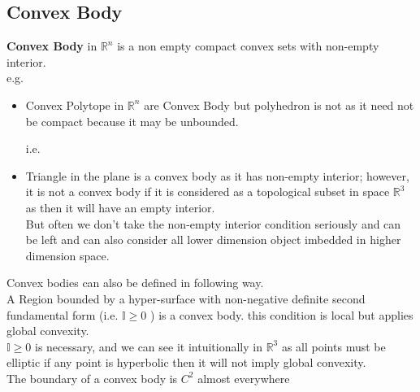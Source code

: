 \documentclass[oneside]{book}
\newtheorem{mydef}{Definition}
\begin{document}
\begin{comment}
\begin{mydef}
A function $f: \mathbb{R}^{n} \rightarrow(-\infty, \infty]$ is \textbf{positively homogeneous} of degree 1 if
$$
f(\alpha x)=\alpha f(x), \quad \text { for all } x \in \mathbb{R}^{n}, \alpha \geq 0
$$
$f$ is convex if and only if it is subadditive, given  $f$ is positively homogeneous  as
$$
 f(x+y) \leq f(x)+f(y)  \text{and }f(\alpha x)=\alpha f(x) $$,
  \quad $ \text { for all } R$
  gives definition of convex function
\end{mydef}

\end{comment}








 \subsection{Convex Body}
 
\textbf{Convex Body } in  $\mathbb{R}^n$  is a non empty compact convex sets with non-empty interior.\\
e.g.\\
\begin{itemize}
    \item   Convex Polytope in $\mathbb{R}^n$ are Convex Body but polyhedron is not as it need not be compact because it may be unbounded. 
    
    i.e.\\
    
    \item 
Triangle in the plane is a convex body as it has non-empty interior; however, it is not a convex body if it is considered as a topological subset in space  $\mathbb{R}^3$ as then it will have an empty interior. 
\\  
But often we don't take the non-empty interior condition seriously and can be left and can also consider all lower dimension object imbedded in higher dimension space.


\end{itemize}

 
Convex bodies can also be defined in following way.\\
     A Region  bounded by a hyper-surface with non-negative definite second fundamental form (i.e. $\mathbb{I} \geq 0 $ ) is a convex body. this condition is local but applies global convexity. \\
     $\mathbb{I} \geq 0 $ is necessary, and we can see it intuitionally in  $\mathbb{R}^3$ as all points must be elliptic if any point is hyperbolic then it will not imply global convexity. \\
     The boundary of a convex body is $C^{2}$ almost everywhere   \\\\
     
\end{document}
